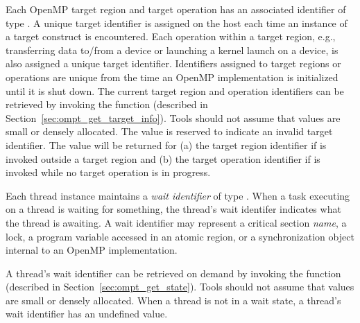 Each OpenMP target region and target operation has an associated identifier of type .
A unique target identifier is assigned on the host each time an instance of a target construct is encountered.
Each operation within a target region, e.g., transferring data to/from a device or launching a kernel launch
on a device, is also assigned a unique target identifier.
Identifiers assigned to target regions or operations
are unique from the time an OpenMP implementation is initialized until it is shut down.
The current target region and operation identifiers can be retrieved by invoking the  function (described in Section~\ref{sec:ompt_get_target_info}).
Tools should not assume that  values are small or densely allocated.
The value  is reserved to indicate an invalid target identifier.
The value  will be returned for (a) the target region identifier if  is invoked outside a target region and (b) the target operation identifier if  is invoked while no target operation is in progress.


Each thread instance maintains a {\em wait identifier} of type .
When a task executing on a thread is waiting for something, the thread's wait identifer indicates what the thread is awaiting.
A wait identifier may represent a critical section {\em name}, a lock,  a program variable accessed in an atomic region, or a synchronization object internal to an OpenMP implementation.
\begin{comment}
\begin{boxedcode}
typedef unsigned long long int ompt_wait_id_t;
\end{boxedcode}
\end{comment}
A thread's wait identifier can be retrieved on demand by invoking the  function (described in Section~\ref{sec:ompt_get_state}).
Tools should not assume that  values are small or densely allocated.
When a thread is not in a wait state, a thread's wait identifier has an undefined value.

